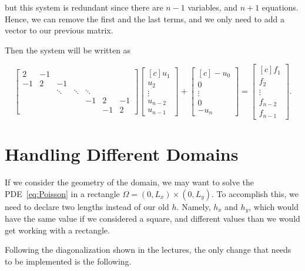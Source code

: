 \documentclass[fontsize=11pt,paper=a4,titlepage]{article}
\begin{document}
but this system is redundant since there are $n - 1$ variables, and $n + 1$
equations. Hence, we can remove the first and the last terms, and we only need
to add a vector to our previous matrix.

Then the system will be written as

\begin{displaymath}
\begin{bmatrix}
	2 & -1 &  &  &  &  &  \\
	-1 & 2 & -1 &  &  &  &  \\
	 &  & \ddots & \ddots & \ddots &  & \\
	 &  &  &  & -1 & 2 & -1 \\
	 &  &  &  &  & -1 & 2
\end{bmatrix}
\begin{bmatrix*}[c]
	u_1 \\
	u_2 \\
	\vdots \\
	u_{n - 2} \\
	u_{n - 1}
\end{bmatrix*}
+ \begin{bmatrix*}[c]
	- u_0 \\
	0 \\
	\vdots \\
	0 \\
	- u_n
\end{bmatrix*}
=
\begin{bmatrix*}[c]
	f_1 \\
	f_2 \\
	\vdots \\
	f_{n - 2} \\
	f_{n - 1}
\end{bmatrix*}.
\end{displaymath}

\section{Handling Different Domains}

If we consider the geometry of the domain, we may want to solve the
PDE~\ref{eq:Poisson} in a rectangle $\Omega = (0, L_x) \times (0, L_y)$. To
accomplish this, we need to declare two lengths instead of our old $h$. Namely,
$h_x$ and $h_y$, which would have the same value if we considered a square, and
different values than we would get working with a rectangle.

Following the diagonalization shown in the lectures, the only change that needs
to be implemented is the following.
\end{document}
